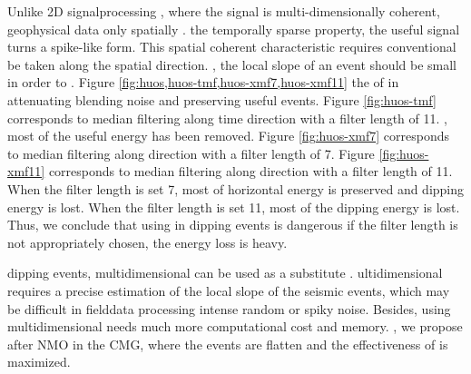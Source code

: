 Unlike 2D signal\old{-}processing , where the signal is multi-dimensionally coherent, geophysical data  only spatially .  the temporally sparse property, the useful signal  turns  a spike-like form. This spatial coherent characteristic requires  conventional   be taken along the spatial direction.  , the local slope of an event should be small in order to . Figure \ref{fig:huos,huos-tmf,huos-xmf7,huos-xmf11}  the  of   in attenuating blending noise and preserving useful events. Figure \ref{fig:huos-tmf} corresponds to  median filtering along  time direction with a filter length of 11. , most of the useful energy has been removed. Figure \ref{fig:huos-xmf7} corresponds to median filtering along  direction with a filter length of 7. Figure \ref{fig:huos-xmf11} corresponds to median filtering along  direction with a filter length of 11. When the filter length is set  7, most of horizontal energy is preserved and  dipping energy is lost. When the filter length is set  11, most of the dipping energy is lost. Thus, we conclude that using   in  dipping\old{-} events  is dangerous\old{,}\new{;} if the filter length is not appropriately chosen, the energy loss is heavy.

 dipping events,  multidimensional  can be used as a substitute \cite[]{mediandeblend}. ultidimensional  requires a precise estimation of the local slope of the seismic events, which may be difficult in field\new{-}data processing   intense random or spiky noise. Besides, using  multidimensional  needs much more computational cost and memory. , we propose   after NMO in the CMG, where the events are flatten and the effectiveness of  is maximized.


